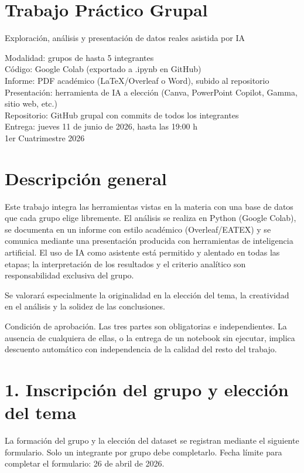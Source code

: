 \documentclass[10pt]{article}
\begin{document}
\section*{Trabajo Práctico Grupal}
Exploración, análisis y presentación de datos reales asistida por IA

Modalidad: grupos de hasta 5 integrantes\\
Código: Google Colab (exportado a .ipynb en GitHub)\\
Informe: PDF académico (LaTeX/Overleaf o Word), subido al repositorio\\
Presentación: herramienta de IA a elección (Canva, PowerPoint Copilot, Gamma, sitio web, etc.)\\
Repositorio: GitHub grupal con commits de todos los integrantes\\
Entrega: jueves 11 de junio de 2026, hasta las 19:00 h\\
1er Cuatrimestre 2026

\section*{Descripción general}
Este trabajo integra las herramientas vistas en la materia con una base de datos que cada grupo elige libremente. El análisis se realiza en Python (Google Colab), se documenta en un informe con estilo académico (Overleaf/EATEX) y se comunica mediante una presentación producida con herramientas de inteligencia artificial. El uso de IA como asistente está permitido y alentado en todas las etapas; la interpretación de los resultados y el criterio analítico son responsabilidad exclusiva del grupo.

Se valorará especialmente la originalidad en la elección del tema, la creatividad en el análisis y la solidez de las conclusiones.

Condición de aprobación. Las tres partes son obligatorias e independientes. La ausencia de cualquiera de ellas, o la entrega de un notebook sin ejecutar, implica descuento automático con independencia de la calidad del resto del trabajo.

\section*{1. Inscripción del grupo y elección del tema}
La formación del grupo y la elección del dataset se registran mediante el siguiente formulario. Solo un integrante por grupo debe completarlo. Fecha límite para completar el formulario: 26 de abril de 2026.
\end{document}
